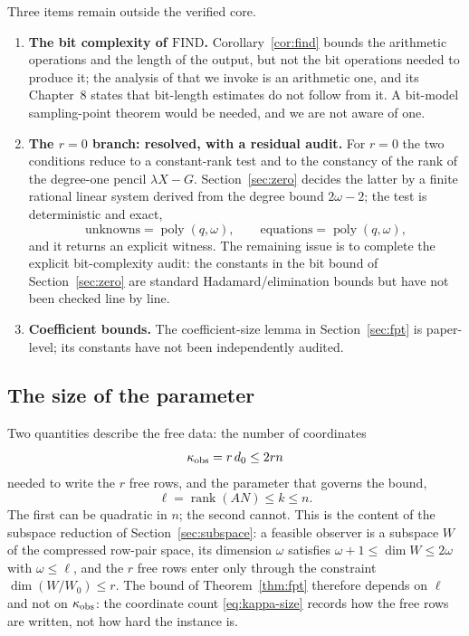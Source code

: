 \documentclass[journal]{IEEEtran}
\theoremstyle{plainn}
\theoremstyle{remark}
\begin{document}
Three items remain outside the verified core.
\begin{enumerate}
\item \textbf{The bit complexity of $\mathrm{FIND}$.} Corollary~\ref{cor:find} bounds the
arithmetic operations and the length of the output, but not the bit operations needed to
produce it; the analysis of \cite{bpr06} that we invoke is an arithmetic one, and its Chapter~8
states that bit-length estimates do not follow from it. A bit-model sampling-point theorem would
be needed, and we are not aware of one.
\item \textbf{The $r=0$ branch: resolved, with a residual audit.} For $r=0$ the two conditions reduce to a constant-rank test and to the constancy of the rank of the degree-one pencil $\lambda X-G$. Section~\ref{sec:zero} decides the latter by a finite rational linear system derived from the degree bound $2\omega-2$; the test is deterministic and exact,
\begin{equation*}
\text{unknowns}=\operatorname{poly}(q,\omega),\qquad
\text{equations}=\operatorname{poly}(q,\omega),
\end{equation*}
and it returns an explicit witness. The remaining issue is to complete the explicit bit-complexity audit: the constants in the bit bound of Section~\ref{sec:zero} are standard Hadamard/elimination bounds but have not been checked line by line.
\item \textbf{Coefficient bounds.} The coefficient-size lemma in Section~\ref{sec:fpt} is paper-level; its constants have not been independently audited.
\end{enumerate}

\subsection{The size of the parameter}\label{sec:paramsize}

Two quantities describe the free data: the number of coordinates
\begin{equation}\label{eq:kappa-size}
\kappa_{\rm obs}=r\,d_0\le2rn
\end{equation}
needed to write the $r$ free rows, and the parameter that governs the bound,
\begin{equation}\label{eq:ell-size}
\ell=\operatorname{rank}(AN)\le k\le n .
\end{equation}
The first can be quadratic in $n$; the second cannot. This is the content of the subspace
reduction of Section~\ref{sec:subspace}: a feasible observer is a subspace $W$ of the
compressed row-pair space, its dimension $\omega$ satisfies $\omega+1\le\dim W\le2\omega$ with
$\omega\le\ell$, and the $r$ free rows enter only through the constraint
$\dim(W/W_0)\le r$. The bound of Theorem~\ref{thm:fpt} therefore depends on $\ell$ and not on
$\kappa_{\rm obs}$: the coordinate count \eqref{eq:kappa-size} records how the free rows are
written, not how hard the instance is.
\end{document}
